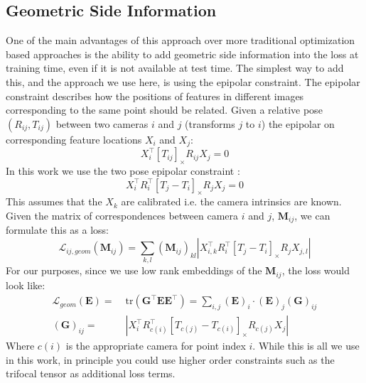 \documentclass[10pt,twocolumn,letterpaper]{article}
\newcommand{\mat}[1]{\mathbf{#1}}
\newcommand{\cross}[1]{[#1]_{\times}}
\begin{document}
\subsection{Geometric Side Information}
One of the main advantages of this approach over more traditional optimization based approaches is the ability to add geometric side information into the loss at training time, even if it is not available at test time.
The simplest way to add this, and the approach we use here, is using the epipolar constraint.
The epipolar constraint describes how the positions of features in different images corresponding to the same point should be related.
Given a relative pose $(R_{ij}, T_{ij})$ between two cameras $i$ and $j$  (transforms $j$ to $i$) the epipolar on corresponding feature locations $X_i$ and $X_j$:
\begin{equation}
X_{i}^\top \cross{T_{ij}}R_{ij} X_{j} = 0
\label{eq:essential_constraint_rel}
\end{equation}
In this work we use the two pose epipolar constraint \cite{tron2014quotient}:
\begin{equation}
X_{i}^\top R_{i}^\top \cross{T_{j} - T_{i}}R_{j} X_{j} = 0
\label{eq:essential_constraint}
\end{equation}
This assumes that the $X_k$ are calibrated i.e. the camera intrinsics are known. 
Given the matrix of correspondences between camera $i$ and $j$, $\mat{M}_{ij}$, we can formulate this as a loss:
\begin{equation}
\mathcal{L}_{ij,geom}(\mat{M}_{ij}) = \sum_{k,l} (\mat{M}_{ij})_{kl} \left|X_{i,k}^\top R_{i}^\top \cross{T_{j} - T_{i}}R_{j} X_{j,l}\right|
\label{eq:geom_cost}
\end{equation}
For our purposes, since we use low rank embeddings of the $\mat{M}_{ij}$, the loss would look like:
\begin{align}
\mathcal{L}_{geom}(\mat{E})
=&\; \mathrm{tr}(\mat{G}^\top \mat{E}\mat{E}^\top) = \sum_{i,j} (\mat{E})_{i} \cdot (\mat{E})_{j} (\mat{G})_{ij} \\
(\mat{G})_{ij} =&\; \left|X_{i}^\top R_{c(i)}^\top \cross{T_{c(j)} - T_{c(i)}}R_{c(j)} X_{j}\right| \nonumber
\label{eq:geom_cost2}
\end{align}
Where $c(i)$ is the appropriate camera for point index $i$.
While this is all we use in this work, in principle you could use higher order constraints such as the trifocal tensor as additional loss terms.


\end{document}
